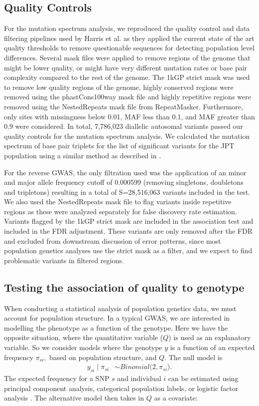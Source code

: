\documentclass[9pt,article]{template}
\begin{document}
\subsection{Quality Controls}
For the mutation spectrum analysis, we reproduced the quality control and data filtering pipelines used by Harris et al. as they applied the current state of the art quality thresholds to remove questionable sequences for detecting population level differences. 
Several mask files were applied to remove regions of the genome that might be lower quality, or might have very different mutation rates or base pair complexity compared to the rest of the genome. 
The 1kGP strict mask was used to remove low quality regions of the genome, highly conserved regions were removed using the phastCons100way mask file and highly repetitive regions were removed using the NestedRepeats mask file from RepeatMasker.
Furthermore, only sites with missingness below 0.01, MAF less than 0.1, and MAF greater than 0.9 were considered.
In total, 7,786,023 diallelic autosomal variants passed our quality controls for the mutation spectrum analysis.
We calculated the mutation spectrum of base pair triplets for the list of significant variants for the JPT population using a similar method as described in  \citep{Harris2017a}.

For the reverse GWAS, the only filtration used was the application of an minor and major allele frequency cutoff of 0.000599 (removing singletons, doubletons and tripletons) resulting in a total of S=28,516,063 variants included in the test. 
We also used the NestedRepeats mask file to flag variants inside repetitive regions as these were analyzed separately for false discovery rate estimation.
Variants flagged by the 1kGP strict mask are included in the association test and included in the FDR adjustment. 
These variants are only removed after the FDR and excluded from downstream discussion of error patterns, since most population genetics analyses use the strict mask as a filter, and we expect to find problematic variants in filtered regions.

\subsection{Testing the association of quality to genotype}
When conducting a statistical analysis of population genetics data, we must account for population structure. In a typical GWAS, we are interested in modelling the phenotype as a function of the genotype. 
Here we have the opposite situation, where the quantitative variable ($Q$) is used as an explanatory variable. 
So we consider models where the genotype $y$ is a function of an expected frequency $\pi_{si},$ based on population structure, and $Q$. 
The null model is 
\begin{align} \label{lfa_basic}
y_{si} \mid \pi_{si}  &\sim Binomial\big( 2, \pi_{si} \big).
\end{align} 
The expected frequency for a SNP $s$ and individual $i$ can be estimated using principal component analysis, categorical population labels, or logistic factor analysis \citep{song2015testing}. The alternative model then takes in $Q$ as a covariate: 
\end{document}
